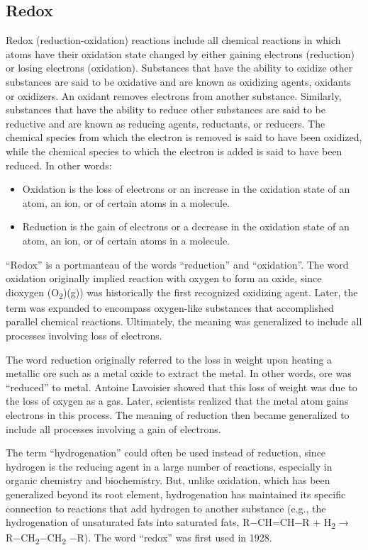 \documentclass[
]{article}
\providecommand{\tightlist}{%
  \setlength{\itemsep}{0pt}\setlength{\parskip}{0pt}}
\begin{document}
\hypertarget{redox}{%
\subsection{Redox}\label{redox}}

Redox (reduction-oxidation) reactions include all chemical reactions in
which atoms have their oxidation state changed by either gaining
electrons (reduction) or losing electrons (oxidation). Substances that
have the ability to oxidize other substances are said to be oxidative
and are known as oxidizing agents, oxidants or oxidizers. An oxidant
removes electrons from another substance. Similarly, substances that
have the ability to reduce other substances are said to be reductive and
are known as reducing agents, reductants, or reducers. The chemical
species from which the electron is removed is said to have been
oxidized, while the chemical species to which the electron is added is
said to have been reduced. In other words:

\begin{itemize}
\tightlist
\item
  Oxidation is the loss of electrons or an increase in the oxidation
  state of an atom, an ion, or of certain atoms in a molecule.
\item
  Reduction is the gain of electrons or a decrease in the oxidation
  state of an atom, an ion, or of certain atoms in a molecule.
\end{itemize}

``Redox'' is a portmanteau of the words ``reduction'' and ``oxidation''.
The word oxidation originally implied reaction with oxygen to form an
oxide, since dioxygen (O\textsubscript{2})(g)) was historically the
first recognized oxidizing agent. Later, the term was expanded to
encompass oxygen-like substances that accomplished parallel chemical
reactions. Ultimately, the meaning was generalized to include all
processes involving loss of electrons.

The word reduction originally referred to the loss in weight upon
heating a metallic ore such as a metal oxide to extract the metal. In
other words, ore was ``reduced'' to metal. Antoine Lavoisier showed that
this loss of weight was due to the loss of oxygen as a gas. Later,
scientists realized that the metal atom gains electrons in this process.
The meaning of reduction then became generalized to include all
processes involving a gain of electrons.

The term ``hydrogenation'' could often be used instead of reduction,
since hydrogen is the reducing agent in a large number of reactions,
especially in organic chemistry and biochemistry. But, unlike oxidation,
which has been generalized beyond its root element, hydrogenation has
maintained its specific connection to reactions that add hydrogen to
another substance (e.g., the hydrogenation of unsaturated fats into
saturated fats, R−CH=CH−R + H\textsubscript{2} →
R−CH\textsubscript{2}−CH\textsubscript{2} −R). The word ``redox'' was
first used in 1928.
\end{document}
